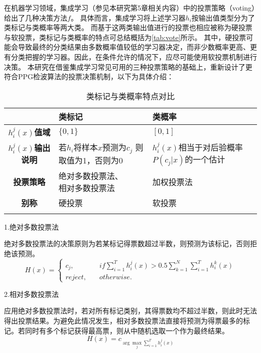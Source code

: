 在机器学习领域，集成学习（参见本研究第5章相关内容）中的投票策略（voting）给出了几种决策方法$f$\cite{Zhou2016}。
具体而言，集成学习将上述学习器$h_i$按输出值类型分为了类标记与类概率等两大类。
而基于这两类输出值进行的投票也相应被称为硬投票与软投票，类标记与类概率的特点可总结概括为\autoref{tab:vote}所示。
其中，硬投票可能会导致最终的分类结果由多数概率值较低的学习器决定，而非少数概率更高、更有分类把握的学习器。因此，在条件允许的情况下，应尽可能使用软投票机制进行决策。
本研究在借鉴集成学习常见可用的三种投票策略的基础上\cite{Kittler1998,Zhou2016}，重新设计了更符合PPG检波算法的投票决策机制，以下为具体介绍：
\begin{table}[htbp]
    \centering
    \caption{\label{tab:vote}类标记与类概率特点对比}
    \begin{tabularx}{\linewidth}{c|X<{\centering}X<{\centering}}
        \Xhline{1pt} 
            &\textbf{类标记}&\textbf{类概率}\\
        \hline
        \textbf{$h_i^j(x)$值域}  &$\{0,1\}$    &$[0,1]$     \\
        \textbf{$h_i^j(x)$输出说明}&\tabincell{c}{若$h_i$将样本$x$预测为$c_j$\\则取值为1，否则为0}&\tabincell{c}{$h_i^j(x)$相当于对后验概率\\$P(c_j|x)$的一个估计}\\
        \textbf{投票策略}&\tabincell{c}{绝对多数投票法、\\相对多数投票法}&加权投票法\\
        \textbf{别称}    &硬投票 &软投票 \\
        \Xhline{1pt}
    \end{tabularx}
\end{table}

1.绝对多数投票法

绝对多数投票法的决策原则为若某标记得票数超过半数，则预测为该标记，否则拒绝该预测。
\begin{equation}
    \label{equ:mvoting}
    H(x)=
    \left \{
    \begin{aligned}
        c_j,&\quad if \sum_{i=1}^T{h_i^j(x)}>0.5\sum_{k=1}^N{\sum_{i=1}^T}{h_i^k(x)}\\
        reject,&\quad otherwise.
    \end{aligned}
    \right.
\end{equation}

2.相对多数投票法

应用绝对多数投票法时，若对所有标记类别，其得票数均不超过半数，则此时无法得出投票结果。为避免此情况发生，相对多数投票法直接将预测为得票最多的标记。若同时有多个标记获得最高票，则从中随机选取一个作为最终结果。
\begin{equation}
    \label{equ:pvoting}
    H(x)=c_{\arg \max\limits_{j} \sum_{i=1}^T{h_i^j(x)}}
\end{equation}

